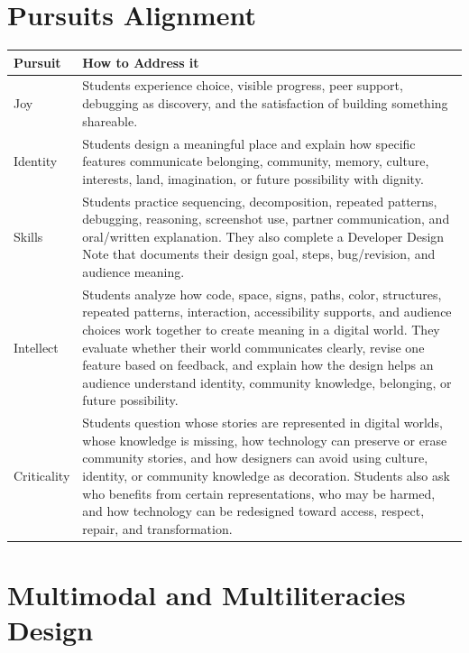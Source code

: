 \section*{Pursuits Alignment}

\renewcommand{\arraystretch}{1.08}
\setlength{\tabcolsep}{3pt}
\begin{tabularx}{\textwidth}{|>{\raggedright\arraybackslash}p{}|Y|}
\hline
{}
\textbf{Pursuit} & \textbf{How to Address it} \\ \hline
{}
Joy & Students experience choice, visible progress, peer support, debugging as discovery, and the satisfaction of building something shareable. \\ \hline
{}
Identity & Students design a meaningful place and explain how specific features communicate belonging, community, memory, culture, interests, land, imagination, or future possibility with dignity. \\ \hline
{}
Skills & Students practice sequencing, decomposition, repeated patterns, debugging, reasoning, screenshot use, partner communication, and oral/written explanation. They also complete a Developer Design Note that documents their design goal, steps, bug/revision, and audience meaning. \\ \hline
{}
Intellect & Students analyze how code, space, signs, paths, color, structures, repeated patterns, interaction, accessibility supports, and audience choices work together to create meaning in a digital world. They evaluate whether their world communicates clearly, revise one feature based on feedback, and explain how the design helps an audience understand identity, community knowledge, belonging, or future possibility. \\ \hline
{}
Criticality & \textcolor{LessonTwoAccent}{Students question whose stories are represented in digital worlds, whose knowledge is missing, how technology can preserve or erase community stories, and how designers can avoid using culture, identity, or community knowledge as decoration. Students also ask who benefits from certain representations, who may be harmed, and how technology can be redesigned toward access, respect, repair, and transformation.} \\ \hline
\end{tabularx}

\section*{Multimodal and Multiliteracies Design}

